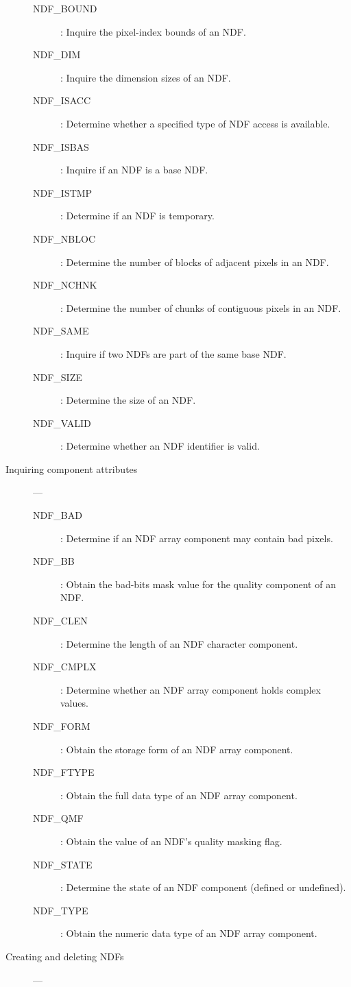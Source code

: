 \begin{description}
\begin{description}
\item [NDF\_BOUND] : Inquire the pixel-index bounds of an NDF.
\item [NDF\_DIM] : Inquire the dimension sizes of an NDF.
\item [NDF\_ISACC] : Determine whether a specified type of NDF access is available.
\item [NDF\_ISBAS] : Inquire if an NDF is a base NDF.
\item [NDF\_ISTMP] : Determine if an NDF is temporary.
\item [NDF\_NBLOC] : Determine the number of blocks of adjacent pixels in an NDF.
\item [NDF\_NCHNK] : Determine the number of chunks of contiguous pixels in an NDF.
\item [NDF\_SAME] : Inquire if two NDFs are part of the same base NDF.
\item [NDF\_SIZE] : Determine the size of an NDF.
\item [NDF\_VALID] : Determine whether an NDF identifier is valid.
\end{description}

\item [Inquiring component attributes] ---

\begin{description}
\item [NDF\_BAD] : Determine if an NDF array component may contain bad pixels.
\item [NDF\_BB] : Obtain the bad-bits mask value for the quality component of an NDF.
\item [NDF\_CLEN] : Determine the length of an NDF character component.
\item [NDF\_CMPLX] : Determine whether an NDF array component holds complex values.
\item [NDF\_FORM] : Obtain the storage form of an NDF array component.
\item [NDF\_FTYPE] : Obtain the full data type of an NDF array component.
\item [NDF\_QMF] : Obtain the value of an NDF's quality masking flag.
\item [NDF\_STATE] : Determine the state of an NDF component (defined or undefined).
\item [NDF\_TYPE] : Obtain the numeric data type of an NDF array component.
\end{description}

\item [Creating and deleting NDFs] ---


\end{description}
